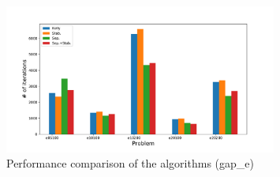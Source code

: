 \documentclass[12pt]{article}
\begin{document}
\begin{figure}[] 
	\begin{center}
		\includegraphics[width=0.8\textwidth]{e}
		\caption{ Performance comparison of the algorithms (gap\_e)}
	\end{center}
\end{figure}
\end{document}
